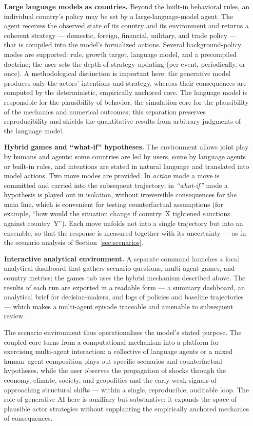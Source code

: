 \documentclass[11pt,a4paper]{article}
\begin{document}
\textbf{Large language models as countries.} Beyond the built-in behavioral rules, an individual
country's policy may be set by a large-language-model agent. The agent receives the observed state of
its country and its environment and returns a coherent strategy --- domestic, foreign, financial,
military, and trade policy --- that is compiled into the model's formalized actions. Several
background-policy modes are supported: rule, growth target, language model, and a precompiled
doctrine; the user sets the depth of strategy updating (per event, periodically, or once). A
methodological distinction is important here: the generative model produces only the actors'
intentions and strategy, whereas their consequences are computed by the deterministic, empirically
anchored core. The language model is responsible for the plausibility of behavior, the simulation
core for the plausibility of the mechanics and numerical outcomes; this separation preserves
reproducibility and shields the quantitative results from arbitrary judgments of the language model.

\textbf{Hybrid games and ``what-if'' hypotheses.} The environment allows joint play by humans and
agents: some countries are led by users, some by language agents or built-in rules, and intentions
are stated in natural language and translated into model actions. Two move modes are provided. In
\emph{action} mode a move is committed and carried into the subsequent trajectory; in
\emph{``what-if''} mode a hypothesis is played out in isolation, without irreversible consequences
for the main line, which is convenient for testing counterfactual assumptions (for example, ``how
would the situation change if country~X tightened sanctions against country~Y''). Each move unfolds
not into a single trajectory but into an ensemble, so that the response is measured together with
its uncertainty --- as in the scenario analysis of Section~\ref{sec:scenarios}.

\textbf{Interactive analytical environment.} A separate command launches a local analytical
dashboard that gathers scenario questions, multi-agent games, and country metrics; the games tab uses
the hybrid mechanism described above. The results of each run are exported in a readable form --- a
summary dashboard, an analytical brief for decision-makers, and logs of policies and baseline
trajectories --- which makes a multi-agent episode traceable and amenable to subsequent review.

The scenario environment thus operationalizes the model's stated purpose. The coupled core turns
from a computational mechanism into a platform for exercising multi-agent interaction: a collective
of language agents or a mixed human--agent composition plays out specific scenarios and
counterfactual hypotheses, while the user observes the propagation of shocks through the economy,
climate, society, and geopolitics and the early weak signals of approaching structural shifts ---
within a single, reproducible, auditable loop. The role of generative AI here is auxiliary but
substantive: it expands the space of plausible actor strategies without supplanting the empirically
anchored mechanics of consequences.
\end{document}
